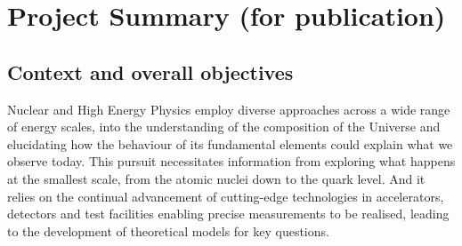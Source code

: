 
\section{Project Summary (for publication)}


\subsection*{Context and overall objectives}

Nuclear and High Energy Physics employ diverse approaches across a wide range of energy scales, into the understanding of the composition of the Universe and elucidating how the behaviour of its fundamental elements could explain what we observe today.  This pursuit necessitates information from exploring what happens at the smallest scale, from the atomic nuclei down to the quark level. And it relies on the continual advancement of cutting-edge technologies in accelerators, detectors and test facilities enabling precise measurements to be realised, leading to the development of theoretical models for key questions.

